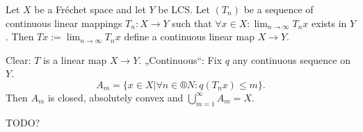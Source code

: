 \documentclass[12pt]{article}					%
\begin{document}
\begin{veta}
	Let $X$ be a Fréchet space and let $Y$ be LCS. Let $(T_n)$ be a sequence of continuous linear mappings $T_n: X \rightarrow Y$ such that $\forall x \in X: \lim_{n \rightarrow ∞} T_n x$ exists in $Y$. Then $Tx := \lim_{n \rightarrow ∞} T_n x$ define a continuous linear map $X \rightarrow Y$.

	\begin{dukazin}
		Clear: $T$ is a linear map $X \rightarrow Y$. „Continuous“: Fix $q$ any continuous sequence on $Y$.
		$$ A_m = \{x \in X | \forall n \in ®N: q(T_n x) ≤ m\}. $$
		Then $A_m$ is closed, absolutely convex and $\bigcup_{m=1}^∞ A_m = X$.
	\end{dukazin}
\end{veta}

TODO?
\end{document}
